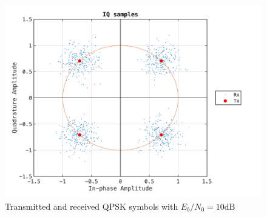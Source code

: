 \documentclass[paper=a4, fontsize=11pt]{scrartcl}	%
\numberwithin{equation}{section}		%
\numberwithin{figure}{section}			%
\numberwithin{table}{section}			%
\begin{document}
\begin{figure}[htb]
\centering
\includegraphics[scale=0.50]{matp_Constellation10dB.png}
\caption{Transmitted and received QPSK symbols with $E_b/N_0 = 10\text{dB}$  }\label{fig:Constellation}
\end{figure}
\end{document}
